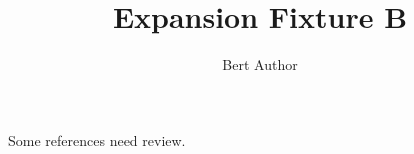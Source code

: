 \title{Expansion Fixture B}\author{Bert Author}
\begin{lemma}\label{main}Some references need review.\end{lemma}
\cite{ambiguous}\cite{metadata}\cite{a}

